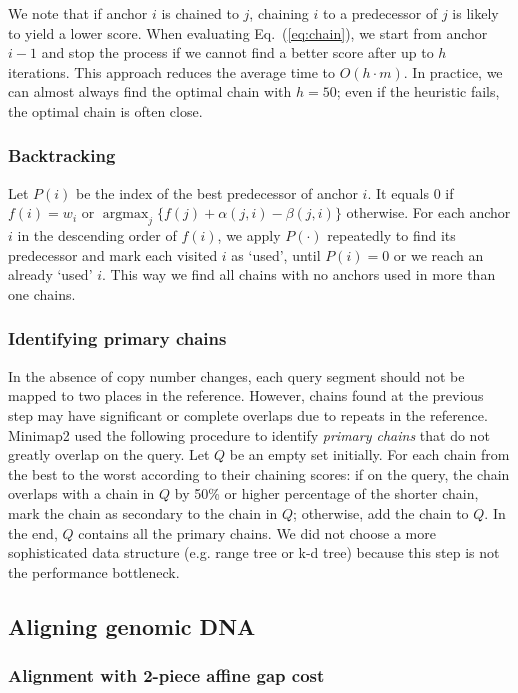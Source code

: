\documentclass{bioinfo}
\DeclareMathOperator*{\argmax}{argmax}
\begin{document}
\begin{methods}
We note that if anchor $i$ is chained to $j$, chaining $i$ to a predecessor
of $j$ is likely to yield a lower score. When evaluating Eq.~(\ref{eq:chain}),
we start from anchor $i-1$ and stop the process if we cannot find a better
score after up to $h$ iterations. This approach reduces the average time to
$O(h\cdot m)$. In practice, we can almost always find the optimal chain with
$h=50$; even if the heuristic fails, the optimal chain is often close.

\subsubsection{Backtracking}
Let $P(i)$ be the index of the best predecessor of anchor $i$. It equals 0 if
$f(i)=w_i$ or $\argmax_j\{f(j)+\alpha(j,i)-\beta(j,i)\}$ otherwise. For each
anchor $i$ in the descending order of $f(i)$, we apply $P(\cdot)$ repeatedly to
find its predecessor and mark each visited $i$ as `used', until $P(i)=0$ or we
reach an already `used' $i$. This way we find all chains with no anchors used
in more than one chains.

\subsubsection{Identifying primary chains}\label{sec:primary}
In the absence of copy number changes, each query segment should not be mapped
to two places in the reference. However, chains found at the previous step may
have significant or complete overlaps due to repeats in the reference.
Minimap2 used the following procedure to identify \emph{primary chains} that do
not greatly overlap on the query. Let $Q$ be an empty set initially. For each
chain from the best to the worst according to their chaining scores: if on the
query, the chain overlaps with a chain in $Q$ by 50\% or higher percentage of
the shorter chain, mark the chain as secondary to the chain in $Q$; otherwise,
add the chain to $Q$. In the end, $Q$ contains all the primary chains. We did
not choose a more sophisticated data structure (e.g. range tree or k-d tree)
because this step is not the performance bottleneck.

\subsection{Aligning genomic DNA}\label{sec:genomic}

\subsubsection{Alignment with 2-piece affine gap cost}


\end{methods}
\end{document}
